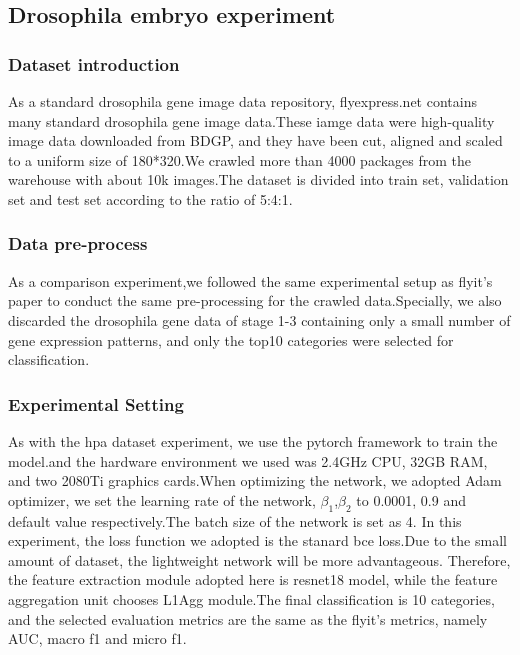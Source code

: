\documentclass[10pt,twocolumn,letterpaper]{article}
\begin{document}
\subsection{Drosophila embryo experiment}

\subsubsection{Dataset introduction}
As a standard drosophila gene image data repository\cite{ref26}, flyexpress.net contains many standard drosophila gene image data.These iamge data were high-quality image data downloaded from BDGP, and they have been cut, aligned and scaled to a uniform size of 180*320.We crawled more than 4000 packages from the warehouse with about 10k images.The dataset is divided into train set, validation set and test set according to the ratio of 5:4:1.

\subsubsection{Data pre-process}
As a comparison experiment,we followed the same experimental setup as flyit's\cite{ref27} paper to conduct the same pre-processing for the crawled data.Specially, we also discarded the drosophila gene data of stage 1-3 containing only a small number of gene expression patterns, and only the top10 categories were selected for classification.

\subsubsection{Experimental Setting}
As with the hpa dataset experiment, we use the pytorch framework to train the model.and the hardware environment we used was 2.4GHz CPU, 32GB RAM, and two 2080Ti graphics cards.When optimizing the network, we adopted Adam optimizer\cite{ref25}, we set the learning rate of the network, $\beta_1$,$\beta_2$ to 0.0001, 0.9 and default value respectively.The batch size of the network is set as 4. In this experiment, the loss function we adopted is the stanard bce loss.Due to the small amount of dataset, the lightweight network will be more advantageous. Therefore, the feature extraction module adopted here is resnet18 model, while the feature aggregation unit chooses L1Agg module.The final classification is 10 categories, and the selected evaluation metrics are the same as the flyit's\cite{ref27} metrics, namely AUC, macro f1 and micro f1.
\end{document}
